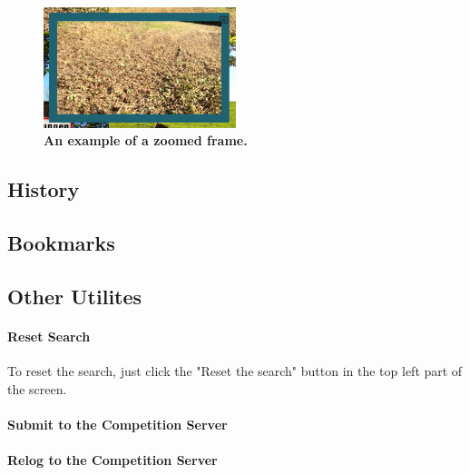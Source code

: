 \begin{figure}[h]
	\centering
	\includegraphics[width=0.5\textwidth]{img/zoom.png}
  \caption{\textbf{An example of a zoomed frame.}}
	\label{fig:zoom}
\end{figure}

\subsection{History}

\subsection{Bookmarks}

\subsection{Other Utilites}
\paragraph{Reset Search}
\label{par:reset}
To reset the search, just click the "Reset the search" button in the top left part of the screen.

\paragraph{Submit to the Competition Server}

\paragraph{Relog to the Competition Server}





